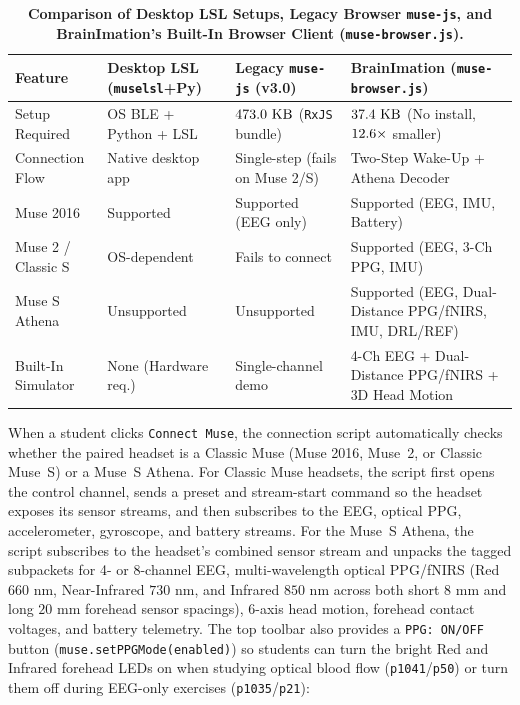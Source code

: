 \documentclass[11pt]{article}
\begin{document}
\begin{table}[t!]
\centering
\caption{\textbf{Comparison of Desktop LSL Setups, Legacy Browser \texttt{muse-js}, and BrainImation's Built-In Browser Client (\texttt{muse-browser.js}).}}
\label{tab:gatt}
\footnotesize
\setlength{\tabcolsep}{5pt}
\begin{tabular}{p{}p{}p{}p{}}
\toprule
\textbf{Feature} & \textbf{Desktop LSL (\texttt{muselsl}+Py)} & \textbf{Legacy \texttt{muse-js} (v3.0)} & \textbf{BrainImation (\texttt{muse-browser.js})} \\
\midrule
Setup Required & OS BLE + Python + LSL & $473.0\text{ KB}$ (\texttt{RxJS} bundle) & $37.4\text{ KB}$ (No install, $12.6\times$ smaller) \\
Connection Flow & Native desktop app & Single-step (fails on Muse 2/S) & Two-Step Wake-Up + Athena Decoder \\
Muse 2016 & Supported & Supported (EEG only) & Supported (EEG, IMU, Battery) \\
Muse 2 / Classic S & OS-dependent & Fails to connect & Supported (EEG, 3-Ch PPG, IMU) \\
Muse S Athena & Unsupported & Unsupported & Supported (EEG, Dual-Distance PPG/fNIRS, IMU, DRL/REF) \\
Built-In Simulator & None (Hardware req.) & Single-channel demo & 4-Ch EEG + Dual-Distance PPG/fNIRS + 3D Head Motion \\
\bottomrule
\end{tabular}
\end{table}

When a student clicks \texttt{Connect Muse}, the connection script automatically checks whether the paired headset is a Classic Muse (Muse 2016, Muse~2, or Classic Muse~S) or a Muse~S Athena. For Classic Muse headsets, the script first opens the control channel, sends a preset and stream-start command so the headset exposes its sensor streams, and then subscribes to the EEG, optical PPG, accelerometer, gyroscope, and battery streams. For the Muse~S Athena, the script subscribes to the headset's combined sensor stream and unpacks the tagged subpackets for 4- or 8-channel EEG, multi-wavelength optical PPG/fNIRS (Red $660\text{ nm}$, Near-Infrared $730\text{ nm}$, and Infrared $850\text{ nm}$ across both short $8\text{ mm}$ and long $20\text{ mm}$ forehead sensor spacings), 6-axis head motion, forehead contact voltages, and battery telemetry. The top toolbar also provides a \texttt{PPG: ON/OFF} button (\texttt{muse.setPPGMode(enabled)}) so students can turn the bright Red and Infrared forehead LEDs on when studying optical blood flow (\texttt{p1041}/\texttt{p50}) or turn them off during EEG-only exercises (\texttt{p1035}/\texttt{p21}):
\end{document}
